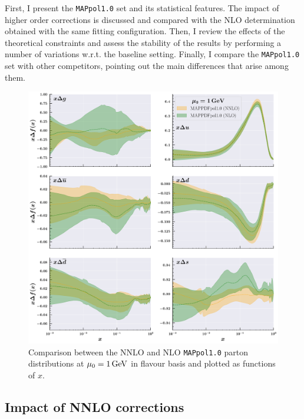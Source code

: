 First, I present the \texttt{MAPpol1.0} set and its statistical features. The impact of higher order corrections is discussed and compared with the NLO determination obtained with the same fitting configuration. Then, I review the effects of the theoretical constraints and assess the stability of the results by performing a number of variations w.r.t. the baseline setting. Finally, I compare the \texttt{MAPpol1.0} set with other competitors, pointing out the main differences that arise among them.

\begin{figure}[t!]
  \centering
  \includegraphics[width=\textwidth]{Chapters/Chapter_4/figs/nnlo_nlo.pdf}
  \caption{\small{Comparison between the NNLO and NLO \texttt{MAPpol1.0} parton distributions at $\mu_0 = 1 \, \textrm{GeV}$ in flavour basis and plotted as functions of $x$.}}
  \label{fig:nnlo_nlo}
\end{figure}

\subsection{Impact of NNLO corrections}

